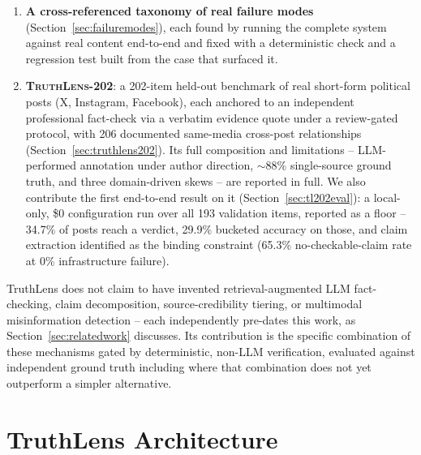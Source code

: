 \documentclass[conference]{IEEEtran}
\begin{document}
\begin{enumerate}
  bottleneck is source specificity, not retrieval relevance.
\item \textbf{A cross-referenced taxonomy of real failure modes}
  (Section~\ref{sec:failuremodes}), each found by running the complete
  system against real content end-to-end and fixed with a deterministic
  check and a regression test built from the case that surfaced it.
\item \textbf{\textsc{TruthLens-202}}: a 202-item held-out benchmark of
  real short-form political posts (X, Instagram, Facebook), each anchored
  to an independent professional fact-check via a verbatim evidence quote
  under a review-gated protocol, with 206 documented same-media
  cross-post relationships (Section~\ref{sec:truthlens202}). Its full
  composition and limitations -- LLM-performed annotation under author
  direction, $\sim$88\% single-source ground truth, and three
  domain-driven skews --
  are reported in full. We also contribute the first end-to-end result
  on it (Section~\ref{sec:tl202eval}): a local-only, \$0 configuration
  run over all 193 validation items, reported as a floor -- 34.7\% of
  posts reach a verdict, 29.9\% bucketed accuracy on those, and claim
  extraction identified as the binding constraint (65.3\%
  no-checkable-claim rate at 0\% infrastructure failure).
\end{enumerate}

TruthLens does not claim to have invented retrieval-augmented LLM
fact-checking, claim decomposition, source-credibility tiering, or
multimodal misinformation detection -- each independently pre-dates this
work, as Section~\ref{sec:relatedwork} discusses. Its contribution is the
specific combination of these mechanisms gated by deterministic,
non-LLM verification, evaluated against independent ground truth including
where that combination does not yet outperform a simpler alternative.

\section{TruthLens Architecture}
\label{sec:architecture}
\end{document}
